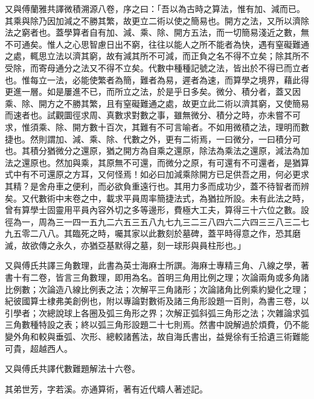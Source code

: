 \begin{pinyinscope}
又與傅蘭雅共譯微積溯源八卷，序之曰：「吾以為古時之算法，惟有加、減而已。其乘與除乃因加減之不勝其繁，故更立二術以使之簡易也。開方之法，又所以濟除法之窮者也。蓋學算者自有加、減、乘、除、開方五法，而一切簡易淺近之數，無不可通矣。惟人之心思智慮日出不窮，往往以能人之所不能者為快，遇有窒礙難通之處，輒思立法以濟其窮，故有減其所不可減，而正負之名不得不立矣；除其所不受除，而寄母通分之法又不得不立矣。代數中種種記號之法，皆出於不得已而立者也。惟每立一法，必能使繁者為簡，難者為易，遲者為速，而算學之境界，藉此得更進一層。如是屢進不已，而所立之法，於是乎日多矣。微分、積分者，蓋又因乘、除、開方之不勝其繁，且有窒礙難通之處，故更立此二術以濟其窮，又使簡易而速者也。試觀圜徑求周、真數求對數之事，雖無微分、積分之時，亦未嘗不可求，惟須乘、除、開方數十百次，其難有不可言喻者。不如用微積之法，理明而數捷也。然則謂加、減、乘、除、代數之外，更有二術焉，一曰微分，一曰積分可也。其積分猶微分之還原，猶之開方為自乘之還原，除法為乘法之還原，減法為加法之還原也。然加與乘，其原無不可還，而微分之原，有可還有不可還者，是猶算式中有不可還原之方耳，又何怪焉！如必曰加減乘除開方已足供吾之用，何必更求其精？是舍舟車之便利，而必欲負重遠行也。其用力多而成功少，蓋不待智者而辨矣。又代數術中末卷之中，載求平員周率簡捷法式，為猶拉所設。未有此法之時，曾有算學士固靈用平員內容外切之多等邊形，費極大工夫，算得三十六位之數。設徑為一，周為三一四一五九二六五三五八九七九三二三八四六二六四三三八三二七九五零二八八。其臨死之時，囑其家以此數刻於墓碑，蓋平時得意之作，恐其磨滅，故欲傳之永久，亦猶亞基默得之墓，刻一球形與員柱形也。」

又與傅氏共譯三角數理，此書為英士海麻士所譔。海麻士專精三角、八線之學，著書十有二卷，皆言三角數理，即用為名。首明三角用比例之理；次論兩角或多角諸比例數；次論造八線比例表之法；次解平三角諸形；次論諸角比例乘約變化之理；紀彼國算士棣弗美創例也，附以專論對數術及諸三角形設題一百則，為書三卷，以引學者；次總說球上各圈及弧三角形之界；次解正弧斜弧三角形之法；次雜論求弧三角數種特設之表；終以弧三角形設題二十七則焉。然書中說解過於煩費，仍不能變外角和較與垂弧、次形、總較諸舊法，故自海氏書出，益覺徐有壬拾遺三術難能可貴，超越西人。

又與傅氏共譯代數難題解法十六卷。

其弟世芳，字若溪。亦通算術，著有近代疇人著述記。


\end{pinyinscope}